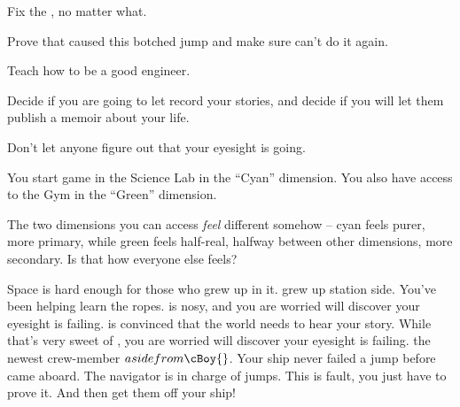 \documentclass[char]{TMFHope}
\begin{document}
\begin{itemz}[Goals]
	\item Fix the \pNew{}, no matter what.
	\item Prove that \cNav{} caused this botched jump and make sure \cNav{\they} can't do it again.
	\item Teach \cBoy{} how to be a good engineer.
	\item Decide if you are going to let \cMed{} record your stories, and decide if you will let them publish a memoir about your life.
	\item Don't let anyone figure out that your eyesight is going.
\end{itemz}

\begin{itemz}[Notes]
	\item You start game in the Science Lab in the ``Cyan'' dimension. You also have access to the Gym  in the ``Green'' dimension.
	\item The two dimensions you can access {\em feel} different somehow -- cyan feels purer, more primary, while green feels half-real, halfway between other dimensions, more secondary.  Is that how everyone else feels?
\end{itemz}

\begin{contacts}
	\contact{\cBoy{}} Space is hard enough for those who grew up in it. \cBoy{} grew up station side. You've been helping \cBoy{\them} learn the ropes.
	\contact{\cWeap{}} \cWeap{} is nosy, and you are worried \cWeap{\they} will discover your eyesight is failing.
	\contact{\cMed{}} \cMed{} is convinced that the world needs to hear your story. While that's very sweet of \cMed{\them}, you are worried \cMed{\they} will discover your eyesight is failing.
	\contact{\cNav{}} \cNav{\They} \cNav{\are} the newest crew-member \(aside from \cBoy{}\). Your ship never failed a jump before \cNav{\they} came aboard. The navigator is in charge of jumps. This is \cNav{\their} fault, you just have to prove it. And then get them off your ship!
\end{contacts}
\end{document}
